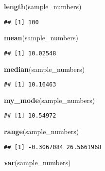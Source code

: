 \documentclass[
]{book}
\newenvironment{Shaded}{\begin{snugshade}}{\end{snugshade}}
\newcommand{\FunctionTok}[1]{\textcolor[rgb]{0.13,0.29,0.53}{\textbf{#1}}}
\newcommand{\NormalTok}[1]{#1}
\begin{document}
\begin{Shaded}
\begin{Highlighting}[]
\FunctionTok{length}\NormalTok{(sample\_numbers)}
\end{Highlighting}
\end{Shaded}

\begin{verbatim}
## [1] 100
\end{verbatim}

\begin{Shaded}
\begin{Highlighting}[]
\FunctionTok{mean}\NormalTok{(sample\_numbers)}
\end{Highlighting}
\end{Shaded}

\begin{verbatim}
## [1] 10.02548
\end{verbatim}

\begin{Shaded}
\begin{Highlighting}[]
\FunctionTok{median}\NormalTok{(sample\_numbers)}
\end{Highlighting}
\end{Shaded}

\begin{verbatim}
## [1] 10.16463
\end{verbatim}

\begin{Shaded}
\begin{Highlighting}[]
\FunctionTok{my\_mode}\NormalTok{(sample\_numbers)}
\end{Highlighting}
\end{Shaded}

\begin{verbatim}
## [1] 10.54972
\end{verbatim}

\begin{Shaded}
\begin{Highlighting}[]
\FunctionTok{range}\NormalTok{(sample\_numbers)}
\end{Highlighting}
\end{Shaded}

\begin{verbatim}
## [1] -0.3067084 26.5661968
\end{verbatim}

\begin{Shaded}
\begin{Highlighting}[]
\FunctionTok{var}\NormalTok{(sample\_numbers)}
\end{Highlighting}
\end{Shaded}
\end{document}
